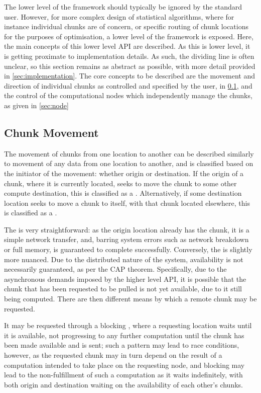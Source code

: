The lower level of the \lsr framework should typically be ignored by the standard user.
However, for more complex design of statistical algorithms, where for instance individual chunks are of concern, or specific routing of chunk locations for the purposes of optimisation, a lower level of the framework is exposed.
Here, the main concepts of this lower level API are described.
As this is lower level, it is getting proximate to implementation details.
As such, the dividing line is often unclear, so this section remains as abstract as possible, with more detail provided in \cref{sec:implementation}.
The core concepts to be described are the movement and direction of individual chunks as controlled and specified by the user, in \cref{sec:cm}, and the control of the computational nodes which independently manage the chunks, as given in \cref{sec:node}

\subsection{Chunk Movement}\label{sec:cm}

The movement of chunks from one location to another can be described similarly to movement of any data from one location to another, and is classified based on the initiator of the movement: whether origin or destination.
If the origin of a chunk, where it is currently located, seeks to move the chunk to some other compute destination, this is classified as a .
Alternatively, if some destination location seeks to move a chunk to itself, with that chunk located elsewhere, this is classified as a .

The  is very straightforward: as the origin location already has the chunk, it is a simple network transfer, and, barring system errors such as network breakdown or full memory, is guaranteed to complete successfully.
Conversely, the  is slightly more nuanced.
Due to the distributed nature of the system, availability is not necessarily guaranteed, as per the CAP theorem\cite{gilbert2002brewer}.
Specifically, due to the asynchronous demands imposed by the higher level API, it is possible that the chunk that has been requested to be pulled is not yet available, due to it still being computed.
There are then different means by which a remote chunk may be requested.

It may be requested through a blocking , where a requesting location waits until it is available, not progressing to any further computation until the chunk has been made available and is sent; such a pattern may lead to race conditions, however, as the requested chunk may in turn depend on the result of a computation intended to take place on the requesting node, and blocking may lead to the non-fulfillment of such a computation as it waits indefinitely, with both origin and destination waiting on the availability of each other's chunks.

